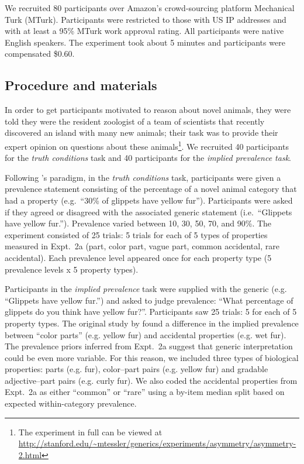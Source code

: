 \documentclass[10pt,letterpaper]{article}
\begin{document}
We recruited 80 participants over Amazon's crowd-sourcing platform Mechanical Turk (MTurk).  
Participants were restricted to those with US IP addresses and with at least a 95\% MTurk work approval rating. 
All participants were native English speakers. 
The experiment took about 5 minutes and participants were compensated \$0.60.

\subsection{Procedure and materials}

In order to get participants motivated to reason about novel animals, they were told they were the resident zoologist of a team of scientists that recently discovered an island with many new animals; their task was to provide their expert opinion on questions about these animals\footnote{The experiment in full can be viewed at \url{http://stanford.edu/~mtessler/generics/experiments/asymmetry/asymmetry-2.html}}. 
We recruited 40 participants for the \emph{truth conditions} task and 40 participants for the \emph{implied prevalence task}. 

Following \citeauthor{Cimpian2010}'s paradigm, in the \emph{truth conditions} task, participants were given a prevalence statement consisting of the percentage of a novel animal category that had a property (e.g.~``30\% of glippets have yellow fur''). 
Participants were asked if they agreed or disagreed with the associated generic statement (i.e.~``Glippets have yellow fur.'').
Prevalence varied between 10, 30, 50, 70, and 90\%.
The experiment consisted of 25 trials: 5 trials for each of 5 types of properties measured in Expt.~2a (part, color part, vague part, common accidental, rare accidental). 
Each prevalence level appeared once for each property type (5 prevalence levels x 5 property types). 

Participants in the \emph{implied prevalence} task were supplied with the generic (e.g. ``Glippets have yellow fur.'') and asked to judge prevalence: ``What percentage of glippets do you think have yellow fur?''. Participants saw 25 trials: 5 for each of 5 property types.
The original study by \citeauthor{Cimpian2010} found a difference in the implied prevalence between ``color parts'' (e.g. yellow fur) and accidental properties (e.g. wet fur).
The prevalence priors inferred from Expt.~2a suggest that generic interpretation could be even more variable.
For this reason, we included three types of biological properties: parts (e.g. fur), color--part pairs (e.g. yellow fur) and gradable adjective--part pairs (e.g. curly fur). 
We also coded the accidental properties from Expt.~2a as either ``common'' or ``rare'' using a by-item median split based on expected within-category prevalence.
\end{document}
